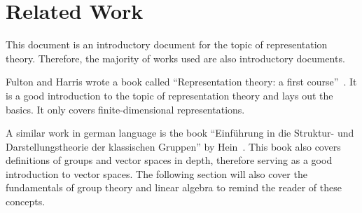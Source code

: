 \section{Related Work}

This document is an introductory document for the topic of representation theory.
Therefore, the majority of works used are also introductory documents.

Fulton and Harris wrote a book called ``Representation theory: a first course''~\cite{fulton2013}.
It is a good introduction to the topic of representation theory and lays out the basics.
It only covers finite-dimensional representations.

A similar work in german language is the book ``Einführung in die Struktur- und Darstellungstheorie der klassischen Gruppen'' by Hein~\cite{hein2013}.
This book also covers definitions of groups and vector spaces in depth, therefore serving as a good introduction to vector spaces.
The following section will also cover the fundamentals of group theory and linear algebra to remind the reader of these concepts.
